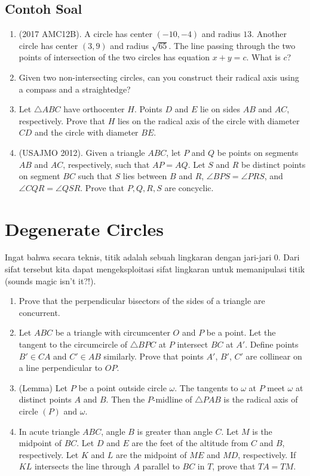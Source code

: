 \documentclass[11pt]{scrartcl}
\begin{document}
\subsection{Contoh Soal}
\begin{enumerate}
    \item (2017 AMC12B). A circle has center $(-10, -4)$ and radius $13$. Another circle has center $(3, 9)$ and radius $\sqrt{65}$. The line passing through the two points of intersection of the two circles has equation $x + y = c$. What is $c$?
\item Given two non-intersecting circles, can you construct their radical axis using a compass and a straightedge?
\item Let $\triangle ABC$ have orthocenter $H$. Points $D$ and $E$ lie on sides $AB$ and $AC$, respectively. Prove that $H$ lies on the radical axis of the circle with diameter $CD$ and the circle with diameter $BE$.
\item (USAJMO 2012). Given a triangle $ABC$, let $P$ and $Q$ be points on segments $AB$ and $AC$, respectively, such that $AP = AQ$. Let $S$ and $R$ be distinct points on segment $BC$ such that $S$ lies between $B$ and $R$, $\angle BPS = \angle PRS$, and $\angle CQR = \angle QSR$. Prove that $P, Q, R, S$ are concyclic.

 \end{enumerate}

 \section{Degenerate Circles}
Ingat bahwa secara teknis, titik adalah sebuah lingkaran dengan jari-jari 0. Dari sifat tersebut kita dapat mengeksploitasi sifat lingkaran untuk memanipulasi titik (sounds magic isn't it?!).

\begin{enumerate}
    \item Prove that the perpendicular bisectors of the sides of a triangle are concurrent.
\item Let $ABC$ be a triangle with circumcenter $O$ and $P$ be a point. Let the tangent to the circumcircle of $\triangle BPC$ at $P$ intersect $BC$ at $A'$. Define points $B' \in CA$ and $C' \in AB$ similarly. Prove that points $A'$, $B'$, $C'$ are collinear on a line perpendicular to $OP$.
\item (Lemma) Let $P$ be a point outside circle $\omega$. The tangents to $\omega$ at $P$ meet $\omega$ at distinct points $A$ and $B$. Then the $P$-midline of $\triangle PAB$ is the radical axis of circle $(P)$ and $\omega$.
\item In acute triangle $ABC$, angle $B$ is greater than angle $C$. Let $M$ is the midpoint of $BC$. Let $D$ and $E$ are the feet of the altitude from $C$ and $B$, respectively. Let $K$ and $L$ are the midpoint of $ME$ and $MD$, respectively. If $KL$ intersects the line through $A$ parallel to $BC$ in $T$, prove that $TA = TM$.
\end{enumerate}
\end{document}
